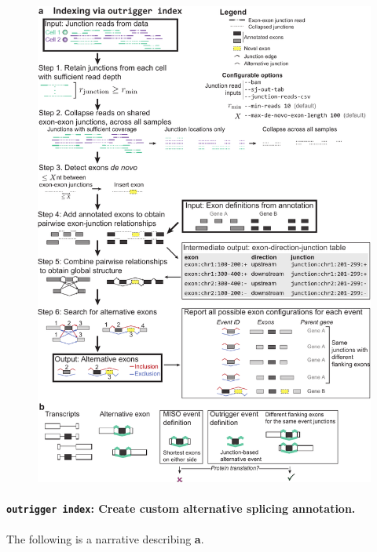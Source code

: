 \clearpage
\begin{figure}[h]
\ContinuedFloat
\captionsetup{labelformat=empty}
\centering
  \includegraphics[width=5.8in]{figures/outrigger_index}
\end{figure}
\addtocounter{figure}{1}
\clearpage


\paragraph{\texttt{outrigger index}: Create custom alternative splicing annotation.} The following is a narrative describing \textbf{a}.


